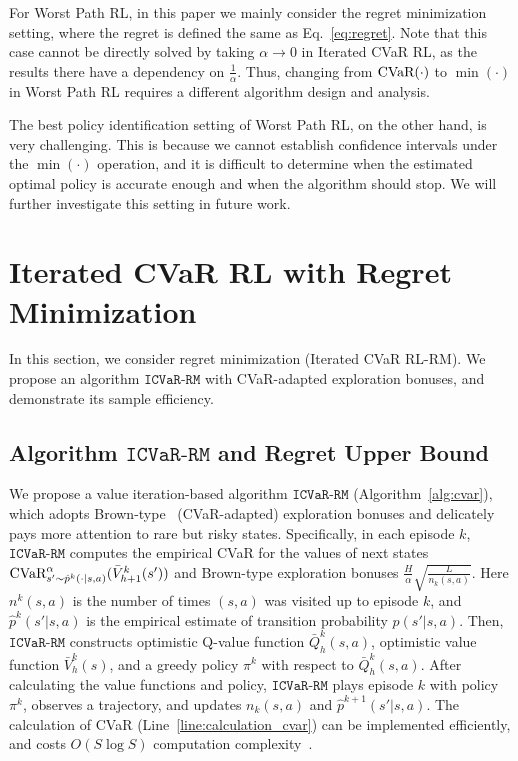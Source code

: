 \documentclass{article} %
\newcommand{\cvar}{\textup{CVaR}}
\newcommand{\algcvar}{\mathtt{ICVaR\mbox{-}RM}}
\newcommand{\longbo}[1]{}
\newcommand{\yihan}[1]{}
\newcommand{\longbo}[1]{{\color{red}  [\text{Longbo:} #1]}}
\newcommand{\yihan}[1]{{\color{teal} [\text{Yihan:} #1]}}
\begin{document}
	
	For Worst Path RL, in this paper we mainly consider the regret minimization setting, where the regret is defined the same as Eq.~\eqref{eq:regret}. Note that this case cannot be directly solved by taking $\alpha\to0$ in Iterated CVaR RL, as the results there have a dependency on $\frac{1}{\alpha}$. Thus, changing from $\cvar(\cdot)$ to $\min(\cdot)$ in Worst Path RL requires a different algorithm design and analysis. %
	
	The best policy identification setting of Worst Path RL, on the other hand, is very challenging. This is because we cannot establish confidence intervals under the $\min(\cdot)$  operation, and it is difficult to determine when the estimated optimal policy is accurate enough and when the algorithm should stop. We will further investigate this setting in future work. %
	
	
	
	
	
	\section{Iterated CVaR RL with Regret Minimization}
	In this section, we consider regret minimization (Iterated CVaR RL-RM). We propose an algorithm $\algcvar$ with CVaR-adapted exploration bonuses, and demonstrate its sample efficiency. 
	
	
	\subsection{Algorithm $\algcvar$ and Regret Upper Bound}
	We propose a value iteration-based algorithm $\algcvar$ (Algorithm~\ref{alg:cvar}), which adopts Brown-type~\citep{brown2007large} (CVaR-adapted) exploration bonuses and delicately pays more attention to rare but risky states.  
	Specifically, in each episode $k$, $\algcvar$ computes the empirical CVaR for the values of next states $\cvar^{\alpha}_{s' \sim \hat{p}^k(\cdot|s,a)}(\bar{V}^k_{h+1}(s'))$ and Brown-type exploration bonuses $\frac{H}{\alpha}\sqrt{\frac{L}{n_k(s,a)}}$.
	Here $n^{k}(s,a)$ is the number of times  $(s,a)$ was visited up to episode $k$, and $\hat{p}^{k}(s'|s,a)$ is the empirical estimate of transition probability $p(s'|s,a)$. 
	Then, $\algcvar$ constructs optimistic Q-value function $\bar{Q}^k_h(s,a)$, optimistic value function $\bar{V}^k_h(s)$, and a greedy policy $\pi^k$ with respect to $\bar{Q}^k_h(s,a)$. 
	After calculating the value functions and policy,  $\algcvar$ plays episode $k$ with policy $\pi^k$, observes a trajectory, and updates $n_k(s,a)$ and  $\hat{p}^{k+1}(s'|s,a)$. 
	The calculation of CVaR (Line~\ref{line:calculation_cvar}) can be implemented efficiently, and costs $O(S \log S)$ computation complexity~\citep{shapiro2021lectures}.
	
\end{document}
